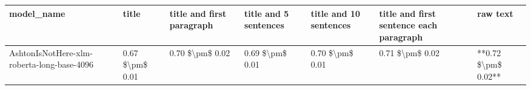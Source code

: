 \begin{tabular}{lllllll}
\toprule
                                model\_name &           title & title and first paragraph & title and 5 sentences & title and 10 sentences & title and first sentence each paragraph &            raw text \\
\midrule
AshtonIsNotHere-xlm-roberta-long-base-4096 & 0.67 \$\textbackslash pm\$ 0.01 &           0.70 \$\textbackslash pm\$ 0.02 &       0.69 \$\textbackslash pm\$ 0.01 &        0.70 \$\textbackslash pm\$ 0.01 &                         0.71 \$\textbackslash pm\$ 0.02 & **0.72 \$\textbackslash pm\$ 0.02** \\
\bottomrule
\end{tabular}
